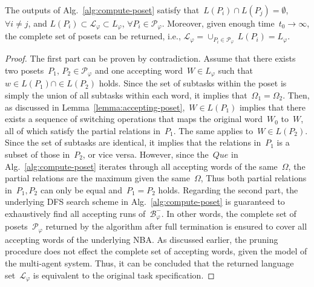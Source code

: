 \begin{lemma}\label{lemma:complete-poset}
The outputs of Alg.~\ref{alg:compute-poset}
satisfy that~$L(P_i)\cap L(P_j)=\emptyset$, $\forall i\neq j$,
and $L(P_i)\subset \mathcal{L}_\varphi \subset L_\varphi$, $\forall P_i \in \mathcal{P}_\varphi$.
Moreover, given enough time~$t_0\rightarrow \infty$,
the complete set of posets can be returned, i.e.,
$\mathcal{L}_\varphi = \cup_{P_i\in \mathcal{P}_\varphi}\,L(P_i)=L_\varphi$.
\end{lemma}
\begin{proof}
The first part can be proven by contradiction.
 Assume that there exists two posets~$P_1,\,P_2\in \mathcal{P}_\varphi$
 and one accepting word~$W\in L_\varphi$ such that~$w\in L(P_1) \cap \in L(P_2)$ holds.
Since the set of subtasks within the poset is simply
 the union of all subtasks within each word,
 it implies that~$\Omega_1 = \Omega_2$.
 Then, as discussed in Lemma~\ref{lemma:accepting-poset},~$W\in L(P_1)$ implies
 that there exists a sequence of switching operations that maps the original
 word~$W_0$ to~$W$, all of which satisfy the partial relations in~$P_1$.
 The same applies to~$W\in L(P_2)$.
 Since the set of subtasks are identical, it implies that the relations in~$P_1$
 is a subset of those in~$P_2$, or vice versa.
 However, since the~$Que$ in Alg.~\ref{alg:compute-poset} iterates through all
 accepting words of the same~$\Omega$,
 the partial relations are the maximum given the same~$\Omega$,
 Thus both partial relations in~$P_1, P_2$ can only be equal and~$P_1=P_2$ holds.
Regarding the second part,
the underlying DFS search scheme in Alg.~\ref{alg:compute-poset} is guaranteed
 to exhaustively find all accepting runs of~$\mathcal{B}^-_{\varphi}$.
 In other words, the complete set of posets~$\mathcal{P}_{\varphi}$ returned
 by the algorithm after full termination is ensured to cover all
 accepting words of the underlying NBA.
 As discussed earlier, the pruning procedure does not effect
 the complete set of accepting words, given the model of the multi-agent system.
 Thus, it can be concluded that the returned language set~$\mathcal{L}_\varphi$
 is equivalent to the original task specification.
\end{proof}


